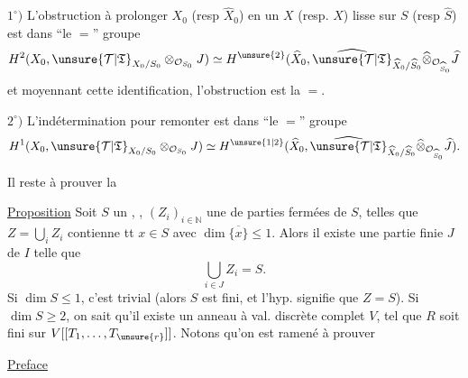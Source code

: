 $1^\circ)$ L'obstruction à prolonger $X_0$ (resp $\widehat X_0$) en un $X$ (resp. $\widehat X$) lisse sur $S$ (resp $\widehat S$) est dans ``le $=$'' groupe
\[
H^2(X_0,\unsure{\mathcal T|\mathfrak T}_{X_0/S_0}\otimes_{\mathcal O_{S_0}}J)\simeq H^{\unsure{2}}(\widehat X_0,\widehat{\unsure{\mathcal T|\mathfrak T}}_{\widehat X_0/\widehat S_0}\widehat\otimes_{\mathcal O_{\widehat S_0}}\widehat J
\]
et moyennant cette identification, l'obstruction est la $=$.

$2^\circ)$ L'indétermination pour remonter est dans ``le $=$'' groupe
\[
H^1(X_0,\unsure{\mathcal T|\mathfrak T}_{X_0/S_0}\otimes_{\mathcal O_{S_0}}J)\simeq H^{\unsure{1|2}}(\widehat X_0,\widehat{\unsure{\mathcal T|\mathfrak T}}_{\widehat X_0/\widehat S_0}\widehat\otimes_{\mathcal O_{\widehat S_0}}\widehat J).
\]

Il reste à prouver la

\uline{Proposition} Soit $S$ un  , , $(Z_i)_{i\in\mathbb N}$ une   de parties fermées  de $S$, telles que $Z=\bigcup_i Z_i$ contienne tt $x\in S$ avec $\dim\overline{\{x\}}\leq1$. Alors il existe une partie finie $J$ de $I$ telle que
\[
\bigcup_{i\in J}Z_i=S.
\]
Si $\dim S\leq1$, c'est trivial (alors  $S$ est fini, et l'hyp. signifie que $Z=S$). Si $\dim S\geq2$, on sait qu'il existe un anneau à val. discrète complet $V$,   tel que $R$ soit fini sur $V[[T_1,\ldots,T_{\unsure{r}}]]$. Notons qu'on est ramené  à prouver


\begin{center}\uline{Preface}\end{center}

